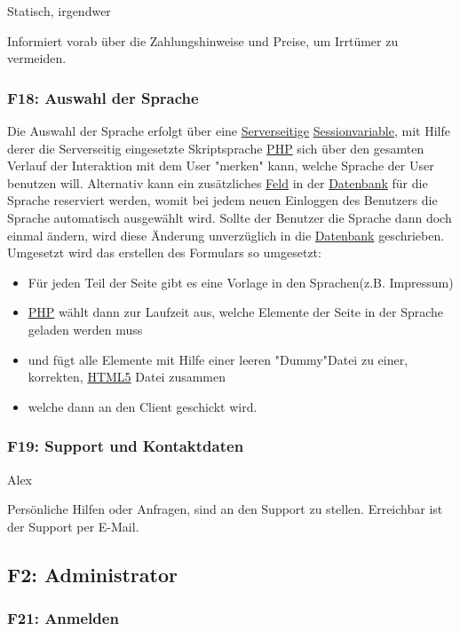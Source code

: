 \documentclass[10pt,a4paper]{scrartcl}
\begin{document}
Statisch, irgendwer

Informiert vorab über die Zahlungshinweise und Preise, um Irrtümer zu vermeiden.

\subsubsection*{F18: Auswahl der Sprache}

Die Auswahl der Sprache erfolgt über eine \underline{Serverseitige} \underline{Sessionvariable}, mit Hilfe derer 
die Serverseitig eingesetzte Skriptsprache \underline{PHP} sich über den gesamten Verlauf der Interaktion mit dem User "merken" kann,
welche Sprache der User benutzen will. Alternativ kann ein zusätzliches \underline{Feld} in der \underline{Datenbank} für die 
Sprache reserviert werden, womit bei jedem neuen Einloggen des Benutzers die Sprache automatisch ausgewählt wird. Sollte der Benutzer
die Sprache dann doch einmal ändern, wird diese Änderung unverzüglich in die \underline{Datenbank} geschrieben.
Umgesetzt wird das erstellen des Formulars so umgesetzt:
\begin{itemize}
 \item Für jeden Teil der Seite gibt es eine Vorlage in den Sprachen(z.B. Impressum)
 \item \underline{PHP} wählt dann zur Laufzeit aus, welche Elemente der Seite in der Sprache geladen werden muss
 \item und fügt alle Elemente mit Hilfe einer leeren "Dummy"Datei zu einer, korrekten, \underline{HTML5} Datei zusammen
 \item welche dann an den Client geschickt wird.
\end{itemize}

\subsubsection*{F19: Support und Kontaktdaten}

Alex

Persönliche Hilfen oder Anfragen, sind an den Support zu stellen. Erreichbar ist der Support per E-Mail. 


\subsection{F2: Administrator}
\subsubsection*{F21: Anmelden}
\end{document}
